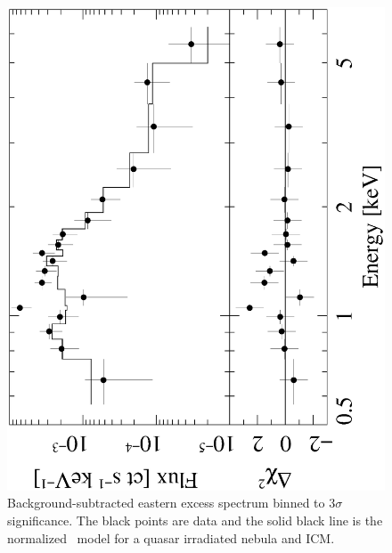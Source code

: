 \begin{figure}
  \begin{center}
    \begin{minipage}{\linewidth}
      \includegraphics*[angle=270, width=\textwidth, trim=0mm 20mm 0mm 0mm, clip]{qso_ec.ps}
    \end{minipage}
    \caption{Background-subtracted eastern excess spectrum binned to
      $3\sigma$ significance. The black points are data and the solid
      black line is the normalized \cloudy\ model for a quasar
      irradiated nebula and ICM.}
    \label{fig:qso}
  \end{center}
\end{figure}

